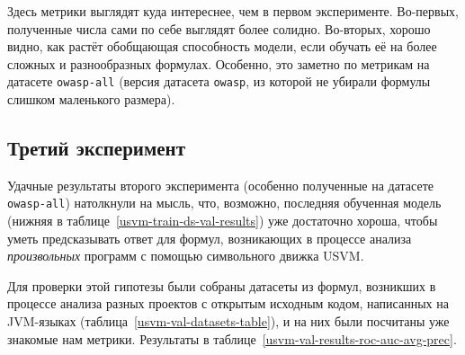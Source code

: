 
Здесь метрики выглядят куда интереснее, чем в первом эксперименте. Во-первых, полученные числа сами по себе выглядят более солидно. Во-вторых, хорошо видно, как растёт обобщающая способность модели, если обучать её на более сложных и разнообразных формулах. Особенно, это заметно по метрикам на датасете \texttt{owasp-all} (версия датасета \texttt{owasp}, из которой не убирали формулы слишком маленького размера).

\subsection{Третий эксперимент}

Удачные результаты второго эксперимента (особенно полученные на датасете \texttt{owasp-all}) натолкнули на мысль, что, возможно, последняя обученная модель (нижняя в таблице~\ref{usvm-train-ds-val-results}) уже достаточно хороша, чтобы уметь предсказывать ответ для формул, возникающих в процессе анализа \textit{произвольных} программ с помощью символьного движка USVM.

Для проверки этой гипотезы были собраны датасеты из формул, возникших в процессе анализа разных проектов с открытым исходным кодом, написанных на JVM-языках (таблица~\ref{usvm-val-datasets-table}), и на них были посчитаны уже знакомые нам метрики. Результаты в таблице~\ref{usvm-val-results-roc-auc-avg-prec}.

